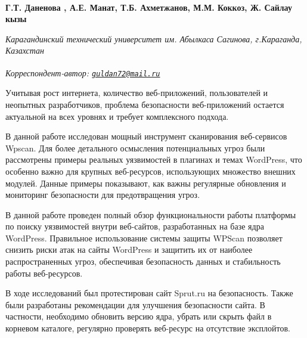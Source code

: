 
\begin{articleheader}

{\bfseries
Г.Т. Даненова\textsuperscript{\envelope } ,
А.Е. Манат,
Т.Б. Ахметжанов,
М.М. Коккоз,
Ж. Сайлау кызы}
\end{articleheader}

\begin{affiliation}
\emph{Карагандинский технический университет им. Абылкаса Сагинова, г.Караганда, Казахстан}

\raggedright \textsuperscript{\envelope }{\em Корреспондент-автор: \href{mailto:guldan72@mail.ru}{\nolinkurl{guldan72@mail.ru}}}
\end{affiliation}

Учитывая рост интернета, количество веб-приложений, пользователей и
неопытных разработчиков, проблема безопасности веб-приложений остается
актуальной на всех уровнях и требует комплексного подхода.

В данной работе исследован мощный инструмент сканирования веб-сервисов
Wpscan. Для более детального осмысления потенциальных угроз были
рассмотрены примеры реальных уязвимостей в плагинах и темах WordPress,
что особенно важно для крупных веб-ресурсов, использующих множество
внешних модулей. Данные примеры показывают, как важны регулярные
обновления и мониторинг безопасности для предотвращения угроз.

В данной работе проведен полный обзор функциональности работы платформы
по поиску уязвимостей внутри веб-сайтов, разработанных на базе ядра
WordPress. Правильное использование системы защиты WPScan позволяет
снизить риски атак на сайты WordPress и защитить их от наиболее
распространенных угроз, обеспечивая безопасность данных и стабильность
работы веб-ресурсов.

В ходе исследований был протестирован сайт Sprut.ru на безопасность.
Также были разработаны рекомендации для улучшения безопасности сайта. В
частности, необходимо обновить версию ядра, убрать или скрыть файл в
корневом каталоге, регулярно проверять веб-ресурс на отсутствие
эксплойтов.

